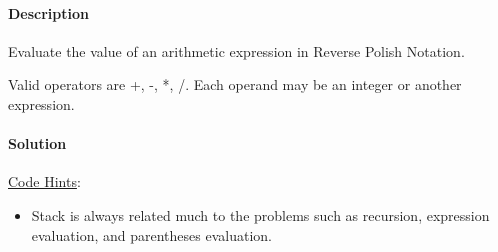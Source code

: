 \paragraph{\color{white} \colorbox{Mahogany}{Description}}
Evaluate the value of an arithmetic expression in Reverse Polish Notation.

Valid operators are +, -, *, /. Each operand may be an integer or another expression.

\paragraph{\color{white} \colorbox{OliveGreen}{Solution}}
\underline{Code Hints}:
\begin{itemize}
    \item Stack is always related much to the problems such as recursion, expression evaluation, and parentheses evaluation.
\end{itemize}